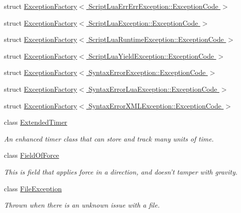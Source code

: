 \begin{DoxyCompactItemize}
\item 
struct \hyperlink{structMezzanine_1_1ExceptionFactory_3_01ScriptLuaErrErrException_1_1ExceptionCode_01_4}{Exception\-Factory$<$ Script\-Lua\-Err\-Err\-Exception\-::\-Exception\-Code $>$}
\item 
struct \hyperlink{structMezzanine_1_1ExceptionFactory_3_01ScriptLuaException_1_1ExceptionCode_01_4}{Exception\-Factory$<$ Script\-Lua\-Exception\-::\-Exception\-Code $>$}
\item 
struct \hyperlink{structMezzanine_1_1ExceptionFactory_3_01ScriptLuaRuntimeException_1_1ExceptionCode_01_4}{Exception\-Factory$<$ Script\-Lua\-Runtime\-Exception\-::\-Exception\-Code $>$}
\item 
struct \hyperlink{structMezzanine_1_1ExceptionFactory_3_01ScriptLuaYieldException_1_1ExceptionCode_01_4}{Exception\-Factory$<$ Script\-Lua\-Yield\-Exception\-::\-Exception\-Code $>$}
\item 
struct \hyperlink{structMezzanine_1_1ExceptionFactory_3_01SyntaxErrorException_1_1ExceptionCode_01_4}{Exception\-Factory$<$ Syntax\-Error\-Exception\-::\-Exception\-Code $>$}
\item 
struct \hyperlink{structMezzanine_1_1ExceptionFactory_3_01SyntaxErrorLuaException_1_1ExceptionCode_01_4}{Exception\-Factory$<$ Syntax\-Error\-Lua\-Exception\-::\-Exception\-Code $>$}
\item 
struct \hyperlink{structMezzanine_1_1ExceptionFactory_3_01SyntaxErrorXMLException_1_1ExceptionCode_01_4}{Exception\-Factory$<$ Syntax\-Error\-X\-M\-L\-Exception\-::\-Exception\-Code $>$}
\item 
class \hyperlink{classMezzanine_1_1ExtendedTimer}{Extended\-Timer}
\begin{DoxyCompactList}\small\item\em An enhanced timer class that can store and track many units of time. \end{DoxyCompactList}\item 
class \hyperlink{classMezzanine_1_1FieldOfForce}{Field\-Of\-Force}
\begin{DoxyCompactList}\small\item\em This is field that applies force in a direction, and doesn't tamper with gravity. \end{DoxyCompactList}\item 
class \hyperlink{classMezzanine_1_1FileException}{File\-Exception}
\begin{DoxyCompactList}\small\item\em Thrown when there is an unknown issue with a file. \end{DoxyCompactList}\item 

\end{DoxyCompactItemize}

